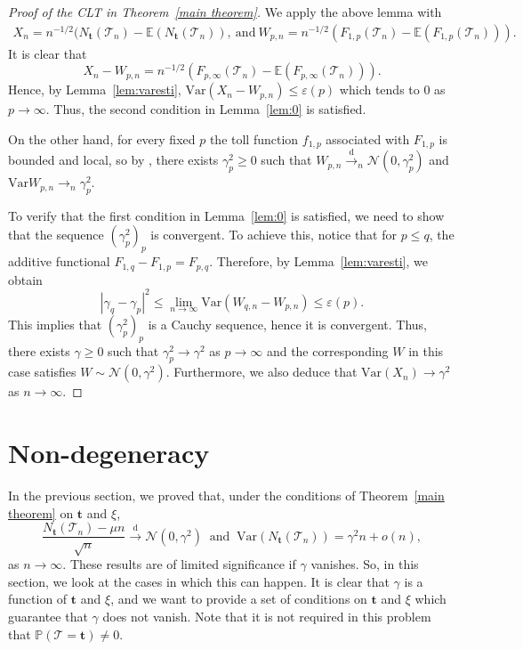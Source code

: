 \documentclass[article]{amsart}
\newcommand{\Var} {\mathrm {Var}}
\newcommand{\tc}{\mathcal{T}}
\newcommand{\st}{\textbf{t}}
\newcommand{\N}{N_{\st}}
\newcommand{\E}{\mathbb{E}}
\newcommand\dto{\overset{\mathrm{d}}{\to}}
\theoremstyle{definition}
\theoremstyle{remark}
\begin{document}
\begin{proof}[Proof of the CLT in Theorem~\ref{main theorem}]
We apply the above lemma with 
\begin{align*}
X_n  =n^{-1/2}(\N(\tc_n)-\E(\N(\tc_n)), \ \text{and} \  
W_{p,n}  = n^{-1/2}(F_{1,p}(\tc_n)-\E(F_{1,p}(\tc_n))).
\end{align*}
It is clear that 
\[
X_n-W_{p,n} = n^{-1/2}(F_{p,\infty}(\tc_n)-\E(F_{p,\infty}(\tc_n))). 
\]
Hence, by Lemma~\ref{lem:varesti}, $\Var(X_n-W_{p,n})\leq \varepsilon(p)$ which tends to 0 as $p\to\infty$.  Thus, the second condition in Lemma~\ref{lem:0} is satisfied. 

On the other hand, for every fixed $p$ the toll function $f_{1,p}$ associated with $F_{1,p}$ is bounded and local, so by \cite[Theorem 1.13]{J16}, there exists $\gamma^2_p\geq 0$ such that $W_{p,n}\dto_n\mathcal{N}(0,\gamma^2_p)$ and $\Var W_{p,n}\to_n \gamma^2_p$. 

To verify that the first condition in Lemma~\ref{lem:0} is satisfied, we need to show that the sequence $(\gamma^2_p)_p$ is convergent. To achieve this, notice that for $p\leq q$, the additive functional $F_{1,q}-F_{1,p}=F_{p,q}$. Therefore, by Lemma~\ref{lem:varesti}, we obtain
\[
|\gamma_q-\gamma_p|^2\leq \lim_{n\to\infty} \Var(W_{q,n}-W_{p,n})\leq \varepsilon(p).
\]
This implies that $(\gamma^2_p)_p$ is a Cauchy sequence, hence it is convergent. Thus, there exists $\gamma\geq 0$ such that $\gamma_p^2\to \gamma^2$ as $p\to\infty$ and the corresponding $W$ in this case satisfies 
$
W \sim  \mathcal{N}(0,\gamma^2).
$
Furthermore, we also deduce that $\mathrm{Var}(X_n)\to  \gamma^2$ as $n\to\infty$.
\end{proof}

\section{Non-degeneracy}
In the previous section, we proved that, under the conditions of Theorem~\ref{main theorem} on $\st$ and $\xi$, 
\[
\frac{N_{\st}(\tc_n)-\mu n}{\sqrt{n}}\dto \mathcal{N}(0,\gamma^2) \ \text{ and } \ \mathrm{Var}(N_{\st}(\tc_n))=\gamma^2n+o(n),
\]
as $n\to\infty$. These results are of limited significance if $\gamma$ vanishes. So, in this section, we look at the cases in which this can happen.  It is clear that $\gamma$ is a function of $\st$ and $\xi$, and we want to provide a set of conditions on $\st$ and $\xi$ which guarantee that $\gamma$ does not vanish. Note that it is not required in this problem that $\mathbb{P}(\tc =\st)\neq 0$. 
\end{document}
